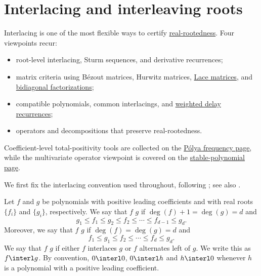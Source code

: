 


\section[interlacingPolynomials]{Interlacing and interleaving roots}

Interlacing is one of the most flexible ways to certify
\hyperref[polynomialRootIntro]{real-rootedness}.  Four viewpoints recur:
\begin{itemize}
\item root-level interlacing, Sturm sequences, and derivative recurrences;
\item matrix criteria using Bézout matrices, Hurwitz matrices,
  \hyperref[fullyInterlacingLace]{Lace matrices}, and
  \hyperref[interlacingFourTermRecurrences]{bidiagonal factorizations};
\item compatible polynomials, common interlacings, and
  \hyperref[interlacingDelayRecurrences]{weighted delay recurrences};
\item operators and decompositions that preserve real-rootedness.
\end{itemize}
Coefficient-level total-positivity tools are collected on the
\hyperref[polyaFrequency]{Pólya frequency page}, while the multivariate
operator viewpoint is covered on the
\hyperref[stablePolynomial]{stable-polynomial page}.

We first fix the interlacing convention used throughout, following
\cite{Wagner1992}; see also \cite{Branden2015}.

\begin{definition}
Let $f$ and $g$ be polynomials with positive leading coefficients and
with real roots $\{f_{i}\}$ and $\{g_{i}\}$, respectively.
We say that $f$ \label{interlacesPolynomial} $g$
if $\deg(f)+1=\deg(g)=d$ and
\[
g_1 \leq f_1 \leq g_2 \leq f_2 \leq \dotsm \leq  f_{d-1}\leq g_{d}.
\]
Moreover, we say that $f$
\label{alternatesLeftOf} $g$ if
$\deg(f)=\deg(g)=d$ and
\[
f_1 \leq g_1 \leq f_2 \leq \dotsm \leq f_{d}\leq g_{d}.
\]
We say that $f$ \label{interleavesPolynomial} $g$
if either $f$ interlaces $g$ or
$f$ alternates left of $g$. We write this as $f \interl g$.
By convention, $0 \interl 0$, $0 \interl h$ and $h \interl 0$ whenever
$h$ is a polynomial with a positive leading coefficient.
\end{definition}


